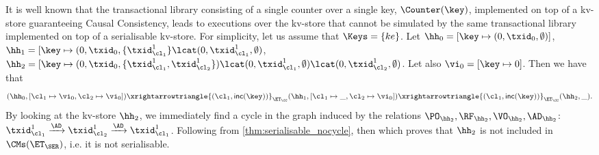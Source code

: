 It is well known that the transactional library consisting of a single counter over a single 
key, $\Counter(\key)$, implemented on top of a kv-store guaranteeing Causal Consistency, 
leads to executions over the kv-store that cannot be simulated by the same transactional 
library implemented on top of a serialisable kv-store. 
For simplicity, let us assume that $\Keys = \{ke\}$.
Let $\hh_{0} = [\key \mapsto (0, \txid_{0}, \emptyset)]$,  
$\hh_1 = [\key \mapsto (0, \txid_{0}, \{\txid_{\cl_1}^{1}\} \lcat (0, \txid_{\cl_1}^{1}, \emptyset)$, 
$\hh_2 = [\key \mapsto (0, \txid_{0}, \{\txid_{\cl_1}^{1}, \txid_{\cl_2}^{1}\}) \lcat (0, \txid_{\cl_1}^{1}, \emptyset) 
\lcat (0, \txid_{\cl_2}^{1}, \emptyset)$. Let also
$\vi_{0} = [\key \mapsto {0}]$. Then we have that 
\[
(\hh_{0}, [\cl_1 \mapsto \vi_0, \cl_2 \mapsto \vi_0]) \xrightarrowtriangle{(\cl_1, \mathsf{inc(\key)})}_{\ET_{\CC}} 
(\hh_1, [\cl_1 \mapsto \_, \cl_2 \mapsto \vi_0]) \xrightarrowtriangle{(\cl_1, \mathsf{inc(\key)})}_{\ET_{\CC}} 
(\hh_2, \_).
\]
By looking at the kv-store $\hh_{2}$, we immediately find a cycle in the graph induced by 
the relations $\PO_{\hh_{2}}, \RF_{\hh_{2}}, \VO_{\hh_{2}}, \AD_{\hh_{2}}$: 
$\txid_{\cl_1}^{1} \xrightarrow{\AD} \txid_{\cl_2}^{1} \xrightarrow{\AD} \txid_{\cl_1}^{1}$. 
Following from \cref{thm:serialisable_nocycle}, then 
which proves that $\hh_2$ is not included in $\CMs(\ET_{\SER})$, i.e. it is 
not serialisable.

